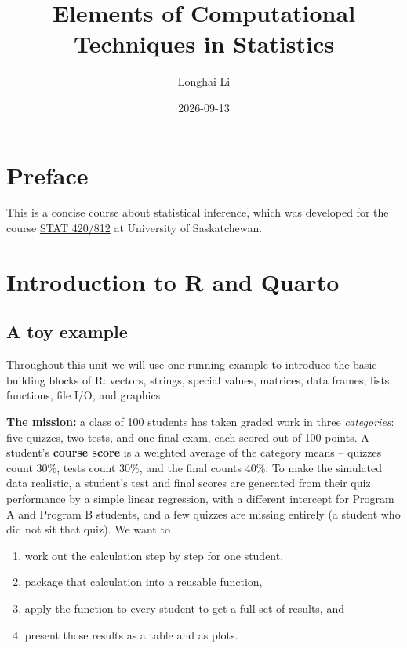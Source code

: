 \documentclass[
  letterpaper,
  DIV=11,
  numbers=noendperiod]{scrreprt}
\title{Elements of Computational Techniques in Statistics}
\author{Longhai Li}
\date{2026-09-13}
\providecommand{\tightlist}{%
  \setlength{\itemsep}{0pt}\setlength{\parskip}{0pt}}
\renewcommand*\contentsname{Table of contents}
\newcommand\contentsname{Table of contents}
\begin{document}
\maketitle

\renewcommand*\contentsname{Table of contents}
{
\setcounter{tocdepth}{2}
\tableofcontents
}


\chapter*{Preface}\label{preface}


This is a concise course about statistical inference, which was
developed for the course
\href{https://longhaisk.github.io/teaching/stat812/}{STAT 420/812} at
University of Saskatchewan.


\chapter{Introduction to R and
Quarto}\label{introduction-to-r-and-quarto}

\section{A toy example}\label{a-toy-example}

Throughout this unit we will use one running example to introduce the
basic building blocks of R: vectors, strings, special values, matrices,
data frames, lists, functions, file I/O, and graphics.

\textbf{The mission:} a class of 100 students has taken graded work in
three \emph{categories}: five quizzes, two tests, and one final exam,
each scored out of 100 points. A student's \textbf{course score} is a
weighted average of the category means -- quizzes count 30\%, tests
count 30\%, and the final counts 40\%. To make the simulated data
realistic, a student's test and final scores are generated from their
quiz performance by a simple linear regression, with a different
intercept for Program A and Program B students, and a few quizzes are
missing entirely (a student who did not sit that quiz). We want to

\begin{enumerate}
\def\labelenumi{\arabic{enumi}.}
\tightlist
\item
  work out the calculation step by step for one student,
\item
  package that calculation into a reusable function,
\item
  apply the function to every student to get a full set of results, and
\item
  present those results as a table and as plots.
\end{enumerate}
\end{document}
